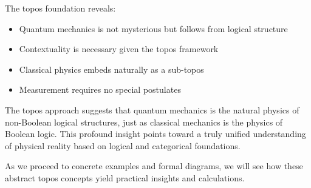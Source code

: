 The topos foundation reveals:

\begin{itemize}[leftmargin=*]
\item Quantum mechanics is not mysterious but follows from logical structure
\item Contextuality is necessary given the topos framework
\item Classical physics embeds naturally as a sub-topos
\item Measurement requires no special postulates
\end{itemize}

The topos approach suggests that quantum mechanics is the natural physics of non-Boolean logical structures, just as classical mechanics is the physics of Boolean logic. This profound insight points toward a truly unified understanding of physical reality based on logical and categorical foundations.

As we proceed to concrete examples and formal diagrams, we will see how these abstract topos concepts yield practical insights and calculations.